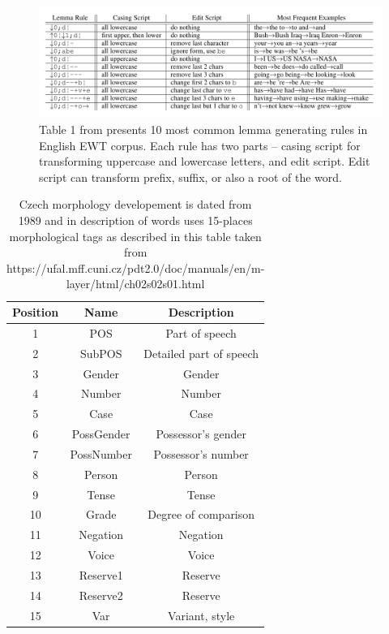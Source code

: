 \begin{figure}[H]
\centering
\includegraphics[width=1\textwidth]{../img/lemma_rules}
\protect\caption{
Table 1 from \citep{Straka2019b} presents 10 most common lemma generating rules in English EWT corpus. Each rule has two parts -- casing script for transforming uppercase and lowercase letters, and edit script. Edit script can transform prefix, suffix, or also a root of the word. %
}
\label{fig:lemma_rules}
\end{figure}

\begin{table}
\centering
\label{Tab:tagset}
\begin{tabular}{ |c|c|c| } 

 \hline
 Position & Name & Description \\ 
 \hline \hline
 1 & POS & Part of speech \\ \hline
 2 & SubPOS & Detailed part of speech \\ \hline
  3 & Gender & Gender \\ \hline
4 & Number & Number \\\hline
  5 & Case & Case \\ \hline
 6 & PossGender & Possessor's gender \\\hline
  7 & PossNumber & Possessor's number \\ \hline
8 & Person & Person \\\hline
  9 & Tense & Tense \\ \hline
 10 & Grade & Degree of comparison\\\hline
  11 & Negation & Negation \\ \hline
 12 & Voice & Voice \\\hline
 13 & Reserve1 & Reserve \\ \hline
14 & Reserve2 & Reserve \\\hline
  15 & Var & Variant, style \\ 
 \hline

\end{tabular}
\caption{Czech morphology developement is dated from 1989 \citep{Hajic2004} %
and in description of words uses 15-places morphological tags as described in this table taken from https://ufal.mff.cuni.cz/pdt2.0/doc/manuals/en/m-layer/html/ch02s02s01.html}
\end{table}

